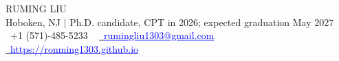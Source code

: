 \documentclass[letterpaper,11pt]{article}
\begin{document}

\begin{center}
    {\Huge \scshape RUMING LIU} \\ \vspace{1pt}
    Hoboken, NJ $|$ Ph.D. candidate, CPT in 2026; expected graduation May 2027 \\ \vspace{1pt}
    \raisebox{-0.1\height}\faPhone\ +1 (571)-485-5233 ~ \href{mailto:rumingliu1303@gmail.com}{\raisebox{-0.2\height}\faEnvelope\  \textcolor{blue}{\underline{rumingliu1303@gmail.com}}} ~ 
    \href{https://ronming1303.github.io}{\raisebox{-0.2\height}\faHome\ \textcolor{blue}{\underline{https://ronming1303.github.io}}}  ~
    \vspace{-8pt}
\end{center}


\end{document}
